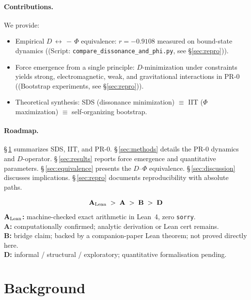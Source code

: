 \documentclass[12pt]{article}
\newcommand{\CatA}{\textbf{A}}
\newcommand{\CatAL}{\ensuremath{\textbf{A}_{\rm Lean}}}
\newcommand{\CatB}{\textbf{B}}
\newcommand{\CatD}{\textbf{D}}
\begin{document}
\paragraph{Contributions.} We provide:
\begin{itemize}[leftmargin=1.2em]
  \item Empirical $D\,\leftrightarrow\,-\,\Phi$ equivalence: $r=-0.9108$ measured on bound-state dynamics ((Script: \texttt{compare\_dissonance\_and\_phi.py}, see \S\ref{sec:repro})).
  \item Force emergence from a single principle: $D$-minimization under constraints yields strong, electromagnetic, weak, and gravitational interactions in PR-0 ((Bootstrap experiments, see \S\ref{sec:repro})).\linebreak
  \item Theoretical synthesis: SDS (dissonance minimization) $\equiv$ IIT ($\Phi$ maximization) $\equiv$ self-organizing bootstrap.
\end{itemize}

\paragraph{Roadmap.} \S\,\ref{sec:background} summarizes SDS, IIT, and PR-0. \S\,\ref{sec:methods} details the PR-0 dynamics and $D$-operator. \S\,\ref{sec:results} reports force emergence and quantitative parameters. \S\,\ref{sec:equivalence} presents the $D$--$\Phi$ equivalence. \S\,\ref{sec:discussion} discusses implications. \S\,\ref{sec:repro} documents reproducibility with absolute paths.

\begin{tcolorbox}[colback=gray!4,colframe=gray!50!black,
  title={\textbf{Claim-strength taxonomy}},
  fonttitle=\bfseries,left=6pt,right=6pt,top=5pt,bottom=5pt]
\small
\[
\CatAL \;>\; \CatA \;>\; \CatB \;>\; \CatD
\]
\textbf{$\CatAL$:} machine-checked exact arithmetic in Lean~4, zero \texttt{sorry}.\\
\textbf{$\CatA$:} computationally confirmed; analytic derivation or Lean cert remains.\\
\textbf{$\CatB$:} bridge claim; backed by a companion-paper Lean theorem; not proved directly here.\\
\textbf{$\CatD$:} informal / structural / exploratory; quantitative formalisation pending.
\end{tcolorbox}

\section{Background}\label{sec:background}
\end{document}
